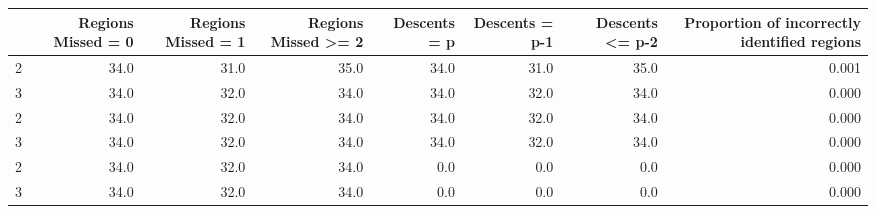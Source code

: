\begin{tabular}{lrrrrrrr}
\toprule
{} &  Regions Missed = 0 &  Regions Missed = 1 &  Regions Missed >= 2 &  Descents = p &  Descents = p-1 &  Descents <= p-2 &  Proportion of incorrectly identified regions \\
\midrule
2 &                34.0 &                31.0 &                 35.0 &          34.0 &            31.0 &             35.0 &                                         0.001 \\
3 &                34.0 &                32.0 &                 34.0 &          34.0 &            32.0 &             34.0 &                                         0.000 \\
2 &                34.0 &                32.0 &                 34.0 &          34.0 &            32.0 &             34.0 &                                         0.000 \\
3 &                34.0 &                32.0 &                 34.0 &          34.0 &            32.0 &             34.0 &                                         0.000 \\
2 &                34.0 &                32.0 &                 34.0 &           0.0 &             0.0 &              0.0 &                                         0.000 \\
3 &                34.0 &                32.0 &                 34.0 &           0.0 &             0.0 &              0.0 &                                         0.000 \\
\bottomrule
\end{tabular}
